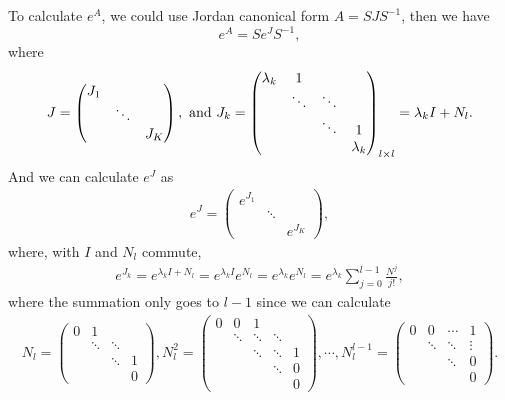 \documentclass[10pt]{book}
\theoremstyle{definition}
\numberwithin{equation}{chapter}
\begin{document}
\medskip

To calculate $e^A$, we could use Jordan canonical form $A = SJS^{-1}$, then we have $$e^A = Se^JS^{-1},$$
where 
$$J = \begin{pmatrix}
    J_1 &  &  \\
     & \ddots &  \\
     &  & J_K
    \end{pmatrix}, \,\, {\rm and} \,\, J_k =  \begin{pmatrix}
    \lambda_k & 1 & & \\
     & \ddots & \ddots & \\
     &  & \ddots & 1 \\
     &  &  & \lambda_k
    \end{pmatrix}_{l\times l} = \lambda_k I + N_l.$$
And we can calculate $e^J$ as 
\begin{align*}
    e^J = \begin{pmatrix}
    e^{J_1} &  &  \\
     & \ddots &  \\
     &  & e^{J_K}
    \end{pmatrix},
\end{align*}
where, with $I$ and $N_l$ commute, 
\begin{align*}
    e^{J_k} = e^{\lambda_k I + N_l} = e^{\lambda_k I}e^{N_l} = e^{\lambda_k} e^{N_l} = e^{\lambda_k} \sum^{l-1}_{j=0}\frac{N^j}{j!},
\end{align*}
where the summation only goes to $l-1$ since we can calculate 
\begin{align*}
    N_l = \begin{pmatrix}
    0 & 1 & & \\
     & \ddots & \ddots & \\
     &  & \ddots & 1 \\
     &  &  & 0
    \end{pmatrix}, N_l^2 = \begin{pmatrix}
    0 & 0 & 1 & &\\
     & \ddots & \ddots & \ddots & \\
     &  & \ddots & \ddots & 1 \\
     &  &  & \ddots & 0 \\ 
     &  &  &  &  0
    \end{pmatrix}, \cdots, N_l^{l-1} = \begin{pmatrix}
    0 & 0 & \cdots & 1 \\
     & \ddots & \ddots & \vdots \\
     &  & \ddots & 0 \\
     &  &  & 0
    \end{pmatrix}.
\end{align*}
\end{document}
